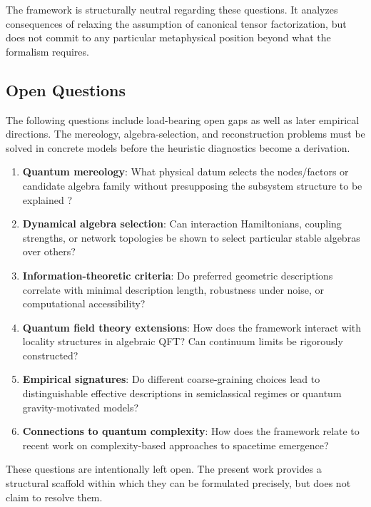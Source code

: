 \documentclass[12pt,a4paper]{article}
\begin{document}
The framework is structurally neutral regarding these questions. It analyzes consequences of relaxing the assumption of canonical tensor factorization, but does not commit to any particular metaphysical position beyond what the formalism requires.

\subsection{Open Questions}

The following questions include load-bearing open gaps as well as later empirical directions.  The mereology, algebra-selection, and reconstruction problems must be solved in concrete models before the heuristic diagnostics become a derivation.

\begin{enumerate}
\item \textbf{Quantum mereology}: What physical datum selects the nodes/factors or candidate algebra family without presupposing the subsystem structure to be explained \cite{Zanardi2004,Cotler2019,CarrollSingh2021}?

\item \textbf{Dynamical algebra selection}: Can interaction Hamiltonians, coupling strengths, or network topologies be shown to select particular stable algebras over others?

\item \textbf{Information-theoretic criteria}: Do preferred geometric descriptions correlate with minimal description length, robustness under noise, or computational accessibility?

\item \textbf{Quantum field theory extensions}: How does the framework interact with locality structures in algebraic QFT? Can continuum limits be rigorously constructed?

\item \textbf{Empirical signatures}: Do different coarse-graining choices lead to distinguishable effective descriptions in semiclassical regimes or quantum gravity-motivated models?

\item \textbf{Connections to quantum complexity}: How does the framework relate to recent work on complexity-based approaches to spacetime emergence?
\end{enumerate}

These questions are intentionally left open. The present work provides a structural scaffold within which they can be formulated precisely, but does not claim to resolve them.
\end{document}
